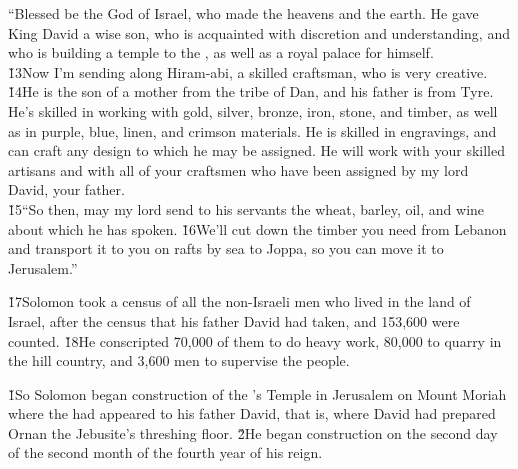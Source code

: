 \begin{poetry}
\poeml ``Blessed be the  God of Israel, who made the heavens and the earth. He gave King David a wise son, who is acquainted with discretion and understanding, and who is building a temple to the , as well as a royal palace for himself. \\
\poeml \v{13}Now I'm sending along Hiram-abi, a skilled craftsman, who is very creative. \v{14}He is the son of a mother from the tribe of Dan, and his father is from Tyre. He's skilled in working with gold, silver, bronze, iron, stone, and timber, as well as in purple, blue, linen, and crimson materials. He is skilled in engravings, and can craft any design to which he may be assigned. He will work with your skilled artisans and with all of your craftsmen who have been assigned by my lord David, your father. \\
\poeml \v{15}``So then, may my lord send to his servants the wheat, barley, oil, and wine about which he has spoken. \v{16}We'll cut down the timber you need from Lebanon and transport it to you on rafts by sea to Joppa, so you can move it to Jerusalem.''
\end{poetry}

\v{17}Solomon took a census of all the non-Israeli men who lived in the land of Israel, after the census that his father David had taken, and 153,600 were counted. \v{18}He conscripted 70,000 of them to do heavy work, 80,000 to quarry in the hill country, and 3,600 men to supervise the people.

\v{1}So Solomon began construction of the 's Temple in Jerusalem on Mount Moriah where the  had appeared to his father David, that is, where David had prepared Ornan the Jebusite's threshing floor. \v{2}He began construction on the second day of the second month of the fourth year of his reign.

